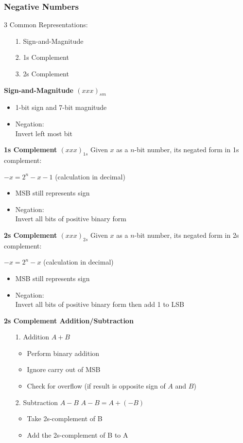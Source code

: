 \documentclass[10pt, twocolumn]{article}
\begin{document}
\subsubsection{Negative Numbers}
3 Common Representations:
\begin{enumerate}
\item[1.]{Sign-and-Magnitude}
\item[2.]{1s Complement}
\item[3.]{2s Complement}
\end{enumerate}
{\bf Sign-and-Magnitude $(xxx)_{sm}$}
\begin{itemize}
\item 1-bit sign and 7-bit magnitude
\item Negation: \\
Invert left most bit
\end{itemize}
{\bf 1s Complement $(xxx)_{1s}$}
\newline
Given $x$ as a $n$-bit number, its negated form in 1s complement:
\begin{center}
$-x = 2^n-x-1$ (calculation in decimal)
\end{center}
\begin{itemize}
\item MSB still represents sign
\item Negation: \\
Invert all bits of positive binary form
\end{itemize}
{\bf 2s Complement $(xxx)_{2s}$}
\newline
Given $x$ as a $n$-bit number, its negated form in 2s complement:
\begin{center}
$-x = 2^n-x$ (calculation in decimal)
\end{center}
\begin{itemize}
\item MSB still represents sign
\item Negation: \\
Invert all bits of positive binary form then add 1 to LSB
\end{itemize}
{\bf 2s Complement Addition/Subtraction}
\begin{enumerate}
\item[1.]{Addition $A+B$}
\begin{itemize}
\item Perform binary addition
\item Ignore carry out of MSB
\item Check for overflow (if result is opposite sign of $A$ and $B$)
\end{itemize}
\item[2.]{Subtraction $A-B$}
\newline
$A-B = A+(-B)$
\begin{itemize}
\item Take 2s-complement of B
\item Add the 2s-complement of B to A
\end{itemize}
\end{enumerate}
\end{document}

